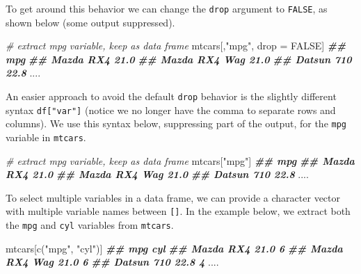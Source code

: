 \documentclass[
]{book}
\newenvironment{Shaded}{\begin{snugshade}}{\end{snugshade}}
\newcommand{\CommentTok}[1]{\textcolor[rgb]{0.56,0.35,0.01}{\textit{#1}}}
\newcommand{\ConstantTok}[1]{\textcolor[rgb]{0.00,0.00,0.00}{#1}}
\newcommand{\DocumentationTok}[1]{\textcolor[rgb]{0.56,0.35,0.01}{\textbf{\textit{#1}}}}
\newcommand{\FunctionTok}[1]{\textcolor[rgb]{0.00,0.00,0.00}{#1}}
\newcommand{\NormalTok}[1]{#1}
\newcommand{\OtherTok}[1]{\textcolor[rgb]{0.56,0.35,0.01}{#1}}
\newcommand{\StringTok}[1]{\textcolor[rgb]{0.31,0.60,0.02}{#1}}
\theoremstyle{definition}
\theoremstyle{definition}
\theoremstyle{definition}
\theoremstyle{definition}
\theoremstyle{remark}
\begin{document}
To get around this behavior we can change the \texttt{drop} argument to \texttt{FALSE}, as shown below (some output suppressed).

\begin{Shaded}
\begin{Highlighting}[]
\CommentTok{\# extract mpg variable, keep as data frame}
\NormalTok{mtcars[,}\StringTok{"mpg"}\NormalTok{, drop }\OtherTok{=} \ConstantTok{FALSE}\NormalTok{]}
\DocumentationTok{\#\#                      mpg}
\DocumentationTok{\#\# Mazda RX4           21.0}
\DocumentationTok{\#\# Mazda RX4 Wag       21.0}
\DocumentationTok{\#\# Datsun 710          22.8}
\NormalTok{....}
\end{Highlighting}
\end{Shaded}

An easier approach to avoid the default \texttt{drop} behavior is the slightly different syntax \texttt{df{[}"var"{]}} (notice we no longer have the comma to separate rows and columns). We use this syntax below, suppressing part of the output, for the \texttt{mpg} variable in \texttt{mtcars}.

\begin{Shaded}
\begin{Highlighting}[]
\CommentTok{\# extract mpg variable, keep as data frame}
\NormalTok{mtcars[}\StringTok{"mpg"}\NormalTok{]}
\DocumentationTok{\#\#                      mpg}
\DocumentationTok{\#\# Mazda RX4           21.0}
\DocumentationTok{\#\# Mazda RX4 Wag       21.0}
\DocumentationTok{\#\# Datsun 710          22.8}
\NormalTok{....}
\end{Highlighting}
\end{Shaded}

To select multiple variables in a data frame, we can provide a character vector with multiple variable names between \texttt{{[}{]}}. In the example below, we extract both the \texttt{mpg} and \texttt{cyl} variables from \texttt{mtcars}.

\begin{Shaded}
\begin{Highlighting}[]
\NormalTok{mtcars[}\FunctionTok{c}\NormalTok{(}\StringTok{"mpg"}\NormalTok{, }\StringTok{"cyl"}\NormalTok{)]}
\DocumentationTok{\#\#                      mpg cyl}
\DocumentationTok{\#\# Mazda RX4           21.0   6}
\DocumentationTok{\#\# Mazda RX4 Wag       21.0   6}
\DocumentationTok{\#\# Datsun 710          22.8   4}
\NormalTok{....}
\end{Highlighting}
\end{Shaded}
\end{document}
